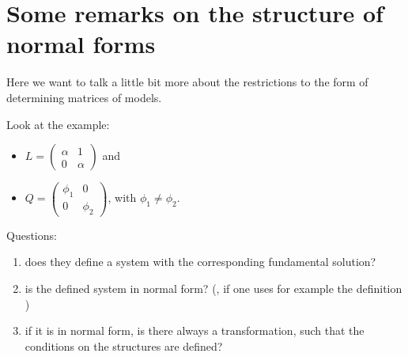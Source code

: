 \chapter{Some remarks on the structure of normal forms}
Here we want to talk a little bit more about the restrictions to the form of
determining matrices of models.

Look at the example:
\begin{itemize}
  \item $L=\begin{pmatrix} \alpha & 1 \\ 0 & \alpha \end{pmatrix}$ and
  \item $Q=\begin{pmatrix} \phi_1 & 0 \\ 0 & \phi_2 \end{pmatrix}$, with
    $\phi_1\neq\phi_2$.
\end{itemize}
Questions:
\begin{enumerate}
  \item does they define a system with the corresponding fundamental solution?
    \checkmark
  \item is the defined system in normal form?
    (\checkmark{}, if one uses for example the definition \cite[p.853]{Loday1994})
  \item if it is in normal form, is there always a transformation, such that
    the conditions on the structures are defined?
\end{enumerate}
